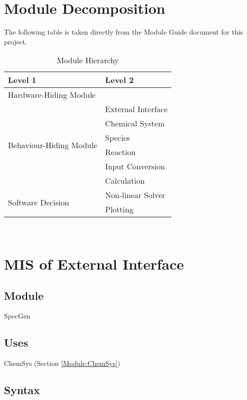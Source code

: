 \documentclass[12pt, titlepage]{article}
\begin{document}
 

\section{Module Decomposition}

The following table is taken directly from the Module Guide document for this project.
\begin{table}[h!]
\centering
\begin{tabular}{p{} p{}}
\toprule
\textbf{Level 1} & \textbf{Level 2}\\
\midrule

{Hardware-Hiding Module} & ~ \\
\midrule

\multirow{6}{0.3\textwidth}{Behaviour-Hiding Module} & External Interface\\
& Chemical System\\
& Species\\
& Reaction\\
& Input Conversion\\
& Calculation\\
\midrule

\multirow{2}{0.3\textwidth}{Software Decision} & Non-linear Solver\\
& Plotting\\
\bottomrule

\end{tabular}
\caption{Module Hierarchy}
\label{TblMH}
\end{table}

\newpage
~\newpage

\section{MIS of External Interface}

\subsection{Module}

SpecGen

\subsection{Uses}

ChemSys (Section \ref{Module:ChemSys})

\subsection{Syntax}
\end{document}
